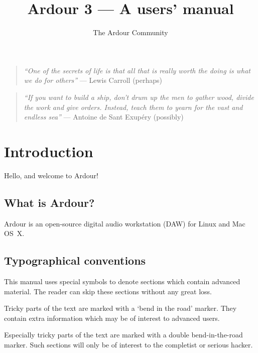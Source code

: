 \documentclass[10pt,a4paper]{book}
\title{Ardour 3 --- A users' manual}
\author{The Ardour Community}
\date{}
\begin{document}
\maketitle


\clearpage
\thispagestyle{empty}

\bigskip
\bigskip
\bigskip

\begin{quote}
\emph{``One of the secrets of life is that all that is really worth the doing is what we do for others''} --- Lewis Carroll (perhaps)
\end{quote}

\bigskip
\bigskip
\bigskip

\begin{quote}
\emph{``If you want to build a ship, don't drum up the men to gather wood, divide the work and give orders.  Instead, teach them to yearn for the vast and endless sea''} --- Antoine de Sant Exup\'ery (possibly)
\end{quote}

\bigskip

\tableofcontents


\chapter{Introduction}

Hello, and welcome to Ardour!

\section{What is Ardour?}

Ardour is an open-source digital audio workstation (DAW) for Linux and
Mac OS~X.

\section{Typographical conventions}

This manual uses special symbols to denote sections which contain
advanced material.  The reader can skip these sections without any
great loss.

\begin{danger}
Tricky parts of the text are marked with a `bend in the road' marker.
They contain extra information which may be of interest to advanced
users.
\end{danger}

\begin{ddanger}
Especially tricky parts of the text are marked with a double
bend-in-the-road marker.  Such sections will only be of interest to
the completist or serious hacker.
\end{ddanger}
\end{document}
